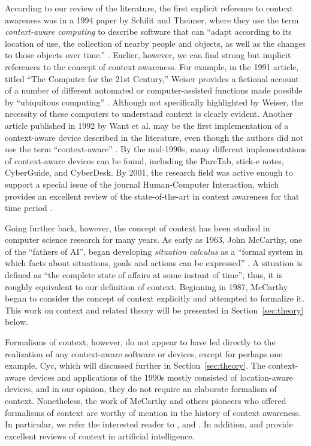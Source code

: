 According to our review of the literature, the first explicit reference to context awareness was in a 1994 paper by Schilit and Theimer, where they use the term \emph{context-aware computing} to describe software that can ``adapt according to its location of use, the collection of nearby people and objects, as well as the changes to those objects over time.'' \cite{schilit1994disseminating}. Earlier, however, we can find strong but implicit references to the concept of context awareness. For example, in the 1991 article, titled ``The Computer for the 21st Century,'' Weiser provides a fictional account of a number of different automated or computer-assisted functions made possible by ``ubiquitous computing'' \cite{weiser1991computer}. Although not specifically highlighted by Weiser, the necessity of these computers to understand context is clearly evident. Another article published in 1992 by Want et al. may be the first implementation of a context-aware device described in the literature, even though the authors did not use the term ``context-aware'' \cite{want1992active}. By the mid-1990s, many different implementations of context-aware devices can be found, including the ParcTab, stick-e notes, CyberGuide, and CyberDesk. By 2001, the research field was active enough to support a special issue of the journal Human-Computer Interaction, which provides an excellent review of the state-of-the-art in context awareness for that time period \cite{moran2001introduction}.

Going further back, however, the concept of context has been studied in computer science research for many years. As early as 1963, John McCarthy, one of the ``fathers of AI'', began developing \emph{situation calculus} as a ``formal system in which facts about situations, goals and actions can be expressed'' \cite{mccarthy1963programs}. A situation is defined as ``the complete state of affairs at some instant of time'', thus, it is roughly equivalent to our definition of context. Beginning in 1987, McCarthy began to consider the concept of context explicitly and attempted to formalize it. This work on context and related theory will be presented in Section~\ref{sec:theory} below.

Formalisms of context, however, do not appear to have led directly to the realization of any context-aware software or devices, except for perhaps one example, Cyc, which will discussed further in Section~\ref{sec:theory}. The context-aware devices and applications of the 1990s mostly consisted of location-aware devices, and in our opinion, they do not require an elaborate formalism of context. Nonetheless, the work of McCarthy and others pioneers who offered formalisms of context are worthy of mention in the history of context awareness. In particular, we refer the interested reader to \cite{McCarthy1993} \cite{guha1991contexts} \cite{mccarthy1997formalizing} \cite{akman1996steps}, and \cite{buvac1993propositional}. In addition, \cite{brezillon1999context} and \cite{akman2002context} provide excellent reviews of context in artificial intelligence.


